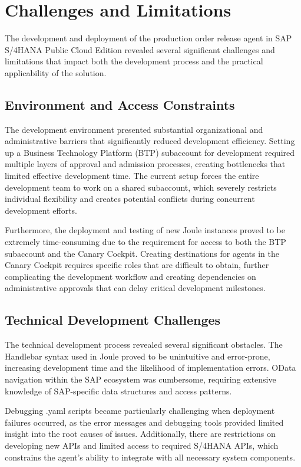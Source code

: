 \section{Challenges and Limitations}

The development and deployment of the production order release agent in SAP S/4HANA Public Cloud Edition revealed several significant challenges and limitations that impact both the development process and the practical applicability of the solution.

\subsection{Environment and Access Constraints}

The development environment presented substantial organizational and administrative barriers that significantly reduced development efficiency. Setting up a Business Technology Platform (BTP) subaccount for development required multiple layers of approval and admission processes, creating bottlenecks that limited effective development time. The current setup forces the entire development team to work on a shared subaccount, which severely restricts individual flexibility and creates potential conflicts during concurrent development efforts.

Furthermore, the deployment and testing of new Joule instances proved to be extremely time-consuming due to the requirement for access to both the BTP subaccount and the Canary Cockpit. Creating destinations for agents in the Canary Cockpit requires specific roles that are difficult to obtain, further complicating the development workflow and creating dependencies on administrative approvals that can delay critical development milestones.

\subsection{Technical Development Challenges}

The technical development process revealed several significant obstacles. The Handlebar syntax used in Joule proved to be unintuitive and error-prone, increasing development time and the likelihood of implementation errors. OData navigation within the SAP ecosystem was cumbersome, requiring extensive knowledge of SAP-specific data structures and access patterns.

Debugging .yaml scripts became particularly challenging when deployment failures occurred, as the error messages and debugging tools provided limited insight into the root causes of issues. Additionally, there are restrictions on developing new APIs and limited access to required S/4HANA APIs, which constrains the agent's ability to integrate with all necessary system components.

